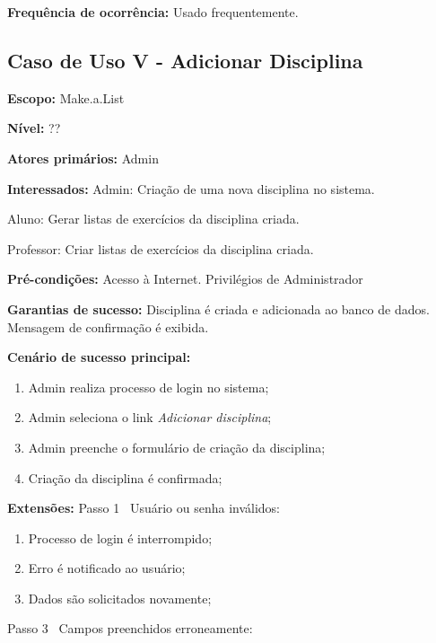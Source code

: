 \documentclass[12pt,oneside,a4paper,article]{abntex2}
\begin{document}
		\textbf{Frequência de ocorrência:} Usado frequentemente.
		
		\subsection{Caso de Uso V - Adicionar Disciplina}
		
		\textbf{Escopo:} Make.a.List 
		
		\textbf{Nível:} ??
		
		\textbf{Atores primários:} Admin
		
		\textbf{Interessados:} Admin: Criação de uma nova disciplina no sistema.
		
		Aluno: Gerar listas de exercícios da disciplina criada.
		
		Professor: Criar listas de exercícios da disciplina criada.
		
		\textbf{Pré-condições:} Acesso à Internet. Privilégios de Administrador
		
		\textbf{Garantias de sucesso:} Disciplina é criada e adicionada ao banco de dados. Mensagem de confirmação é exibida.
		
		\textbf{Cenário de sucesso principal:}
		
		\begin{enumerate}
			\item Admin realiza processo de login no sistema;
			
			\item Admin seleciona o link \textit{Adicionar disciplina};
			
			\item Admin preenche o formulário de criação da disciplina;
			
			\item Criação da disciplina é confirmada;
			
			
		\end{enumerate}
		
		\textbf{Extensões:} Passo 1 \textrightarrow \ Usuário ou senha inválidos:
		
		\begin{enumerate}[label=\alph*.]	
			\item Processo de login é interrompido;
			\item Erro é notificado ao usuário;
			\item Dados são solicitados novamente;
		\end{enumerate}
		
		Passo 3 \textrightarrow \ Campos preenchidos erroneamente:
		
\end{document}
